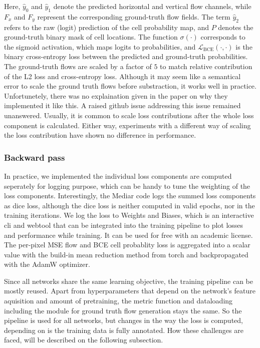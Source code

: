 Here, $\hat{y}_0$ and $\hat{y}_1$ denote the predicted horizontal and vertical flow channels, while $F_x$ and $F_y$ represent the corresponding ground-truth flow fields. The term $\hat{y}_2$ refers to the raw (logit) prediction of the cell probability map, and $P$ denotes the ground-truth binary mask of cell locations. The function $\sigma(\cdot)$ corresponds to the sigmoid activation, which maps logits to probabilities, and $\mathcal{L}_{\text{BCE}}(\cdot,\cdot)$ is the binary cross-entropy loss between the predicted and ground-truth probabilities. The ground-truth flows are scaled by a factor of $5$ to match relative contribution of the L2 loss and cross-entropy loss. Although it may seem like a semantical error to scale the ground truth flows before substraction, it works well in practice. Unfortunetely, there was no explaination given in the paper on why they implemented it like this. A raised github issue addressing this issue remained unanswered. Usually, it is common to scale loss contributions after the whole loss component is calculated. Either way, experiments with a different way of scaling the loss contribution have shown no difference in performance.  


\subsubsection{Backward pass}


In practice, we implemented the individual loss components are computed seperately for logging purpose, which can be handy to tune the weighting of the loss components. Interestingly, the Mediar code logs the summed loss components as dice loss, although the dice loss is neither computed in valid epochs, nor in the training iterations. We log the loss to Weights and Biases, which is an interactive cli and webtool that can be integrated into the training pipeline to plot losses and performance while training. It can be used for free with an academic license. The per-pixel MSE flow and BCE cell probablity loss is aggregated into a scalar value with the build-in mean reduction method from torch and backpropagated with the AdamW optimizer.

\vspace{1em} %

Since all networks share the same learning objective, the training pipeline can be mostly reused. Apart from hyperparameters that depend on the network's feature aquisition and amount of pretraining, the metric function and dataloading including the module for ground truth flow generation stays the same. So the pipeline is used for all networks, but  changes in the way the loss is computed, depending on is the training data is fully annotated. How these challenges are faced, will be described on the following subsection.

